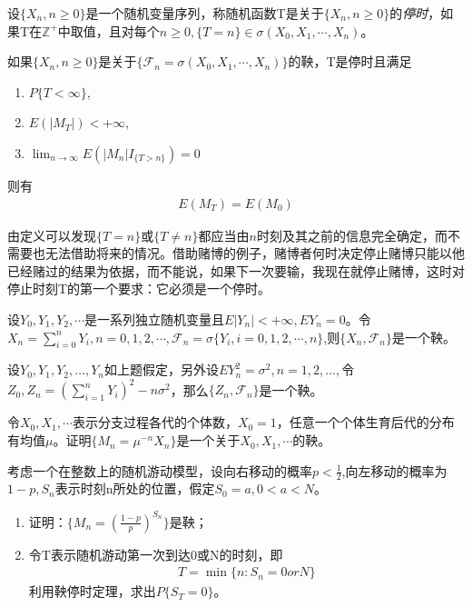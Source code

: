 \begin{theorem}[停时定理]\label{prop:Downtime}
	设\(\{X_n,n\geqslant 0\}\)是一个随机变量序列，称随机函数T是关于\(\{X_n,n\geqslant 0\}\)的\emph{停时}，如果T在\(\mathbb{Z^+}\)中取值，且对每个\(n\geqslant 0,\{T=n\}\in \sigma(X_0,X_1,\cdots,X_n)\)。

	如果\(\{X_n,n\geqslant0\}\)是关于\(\{\mathscr{F}_n=\sigma(X_0,X_1,\cdots,X_n)\}\)的鞅，T是停时且满足
	\begin{enumerate}[\bfseries (1)]
		\item \(P\{T<\infty\}\),
		\item \(E(|M_T|)<+\infty\),
		\item \(\lim_{n\to \infty}E(|M_n|I_{\{T>n\}})=0\)
	\end{enumerate}
	则有
	\begin{align*}
		E(M_T)=E(M_0)
	\end{align*}
\end{theorem}

由定义可以发现\(\{T=n\}\)或\(\{T\neq n\}\)都应当由\(n\)时刻及其之前的信息完全确定，而不需要也无法借助将来的情况。借助赌博的例子，赌博者何时决定停止赌博只能以他已经赌过的结果为依据，而不能说，如果下一次要输，我现在就停止赌博，这时对停止时刻T的第一个要求：它必须是一个停时。

\begin{Exercises}
	\item 设\(Y_0,Y_1,Y_2,\cdots\)是一系列独立随机变量且\(E\lvert Y_n\rvert<+\infty,EY_n=0\)。令\(X_n=\sum_{i=0}^{n}Y_i,n=0,1,2,\cdots,\mathscr{F}_n=\sigma\{Y_i,i=0,1,2,\cdots,n\}\),则\(\{X_n,\mathscr{F}_n\}\)是一个鞅。
	\newpage
	\item 设\(Y_0,Y_1,Y_2,\ldots ,Y_n\)如上题假定，另外设\(EY^2_n=\sigma^2,n=1,2,\ldots,\)令\(Z_0,Z_n=\left(\sum_{i=1}^{n}Y_i\right)^2-n\sigma^2\)，那么\(\{Z_n,\mathscr{F}_n\}\)是一个鞅。
	\vspace{30em}
	\item 令\(X_0,X_1,\cdots\)表示分支过程各代的个体数，\(X_0=1\)，任意一个个体生育后代的分布有均值\(\mu\)。证明\(\{M_n=\mu^{-n}X_n\}\)是一个关于\(X_0,X_1,\cdots\)的鞅。
	\newpage
	\item 考虑一个在整数上的随机游动模型，设向右移动的概率\(p<\frac{1}{2}\),向左移动的概率为\(1-p,S_n\)表示时刻n所处的位置，假定\(S_0=a,0<a<N\)。
	\begin{enumerate}[\bfseries (1)]
		\item 证明：\(\{M_n=\left(\frac{1-p}{p}\right)^{S_n}\}\)是鞅；
		\item 令T表示随机游动第一次到达0或N的时刻，即
		      \begin{align*}
			      T=\min\{n:S_n=0orN\}
		      \end{align*}
		      利用鞅停时定理，求出\(P\{S_T=0\}\)。
	\end{enumerate}
\end{Exercises}